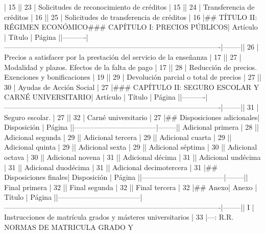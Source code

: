\documentclass{article}
\begin{document}
\begin{itemize}
{{{{{{                         | 15     |\n| 23       | Solicitudes de reconocimiento de créditos                                                  | 15     |\n| 24       | Transferencia de créditos                                                                   | 16     |\n| 25       | Solicitudes de transferencia de créditos                                                    | 16     |\n\n## TÍTULO II: RÉGIMEN ECONÓMICO\n\n### CAPÍTULO I: PRECIOS PÚBLICOS\n\n| Artículo | Título                                                                                     | Página |\n|----------|-------------------------------------------------------------------------------------------|--------|\n| 26       | Precios a satisfacer por la prestación del servicio de la enseñanza                        | 17     |\n| 27       | Modalidad y plazos. Efectos de la falta de pago                                           | 17     |\n| 28       | Reducción de precios. Exenciones y bonificaciones                                          | 19     |\n| 29       | Devolución parcial o total de precios                                                      | 27     |\n| 30       | Ayudas de Acción Social                                                                     | 27     |\n\n### CAPÍTULO II: SEGURO ESCOLAR Y CARNÉ UNIVERSITARIO\n\n| Artículo | Título                                                                                     | Página |\n|----------|-------------------------------------------------------------------------------------------|--------|\n| 31       | Seguro escolar.                                                                           | 27     |\n| 32       | Carné universitario                                                                        | 27     |\n\n## Disposiciones adicionales\n\n| Disposición                       | Página |\n|-----------------------------------|--------|\n| Adicional primera                  | 28     |\n| Adicional segunda                  | 29     |\n| Adicional tercera                  | 29     |\n| Adicional cuarta                   | 29     |\n| Adicional quinta                   | 29     |\n| Adicional sexta                    | 29     |\n| Adicional séptima                 | 30     |\n| Adicional octava                  | 30     |\n| Adicional novena                  | 31     |\n| Adicional décima                  | 31     |\n| Adicional undécima                | 31     |\n| Adicional duodécima               | 31     |\n| Adicional decimotercera           | 31     |\n\n## Disposiciones finales\n\n| Disposición                       | Página |\n|-----------------------------------|--------|\n| Final primera                      | 32     |\n| Final segunda                      | 32     |\n| Final tercera                      | 32     |\n\n## Anexo\n\n| Anexo                              | Título                                                                                     | Página |\n|-----------------------------------|-------------------------------------------------------------------------------------------|--------|\n| I                                 | Instrucciones de matrícula grados y másteres universitarios                               | 33     |\n\n---\n\nFUENTE: R.R. NORMAS DE MATRICULA GRADO Y }}}}}}
\end{itemize}
\end{document}
